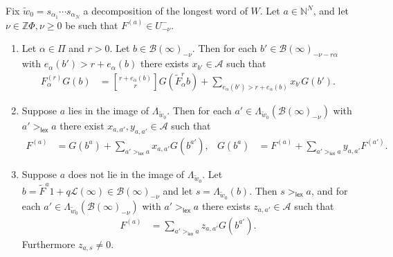 \documentclass[11pt,fleqn]{article}
\newcommand\NN{\mathbb N}
\newcommand\ZZ{\mathbb Z}
\newcommand\qbinom[2]{\genfrac{[}{]}{0pt}{0}{#1}{#2}}
\newcommand\A{\mathcal A}
\newcommand\B{\mathcal B}
\renewcommand\L{\mathcal L}
\newcommand\lex{\mathsf{lex}}
\begin{document}
\begin{Lemma*}
Fix $\tilde w_0 = s_{\alpha_1} \cdots s_{\alpha_N}$ a decomposition of the 
longest word of $W$. Let $a \in \NN^N$, and let $\nu \in \ZZ\Phi, \nu \geq 0$ 
be such that $F^{(a)} \in U^-_{-\nu}$.
\begin{enumerate}[label=(\alph*)]
\item 
\label{pre}
Let $\alpha \in \Pi$ and $r > 0$. Let $b \in \B(\infty)_{-\nu}$. Then
for each $b' \in \B(\infty)_{-\nu - r\alpha}$ with $e_\alpha(b') > r + 
e_\alpha(b)$ there exists $x_{b'} \in \A$ such that
\begin{align*}
F^{(r)}_\alpha G(b) 
  &= \qbinom{r+e_\alpha(b)}{r} G(\tilde F_{\alpha}^r b) 
  	+ \sum_{e_{\alpha}(b') > r + e_\alpha(b)} x_{b'} G(b').
\end{align*}

\item 
\label{in-image}
Suppose $a$ lies in the image of $\Lambda_{\tilde w_0}$. Then for each $a' \in 
\Lambda_{\tilde w_0} (\B(\infty)_{-\nu})$ with $a' >_{\lex} a$ there exist 
$x_{a,a'}, y_{a,a'} \in \A$ such that
\begin{align*}
F^{(a)}
  &= G(b^a) + \sum_{a' >_{\lex} a} x_{a,a'} G(b^{a'}), &
G(b^a) 
  &= F^{(a)} + \sum_{a' >_{\lex} a} y_{a,a'} F^{(a')}.
\end{align*}

\item 
\label{not-in-image}
Suppose $a$ does not lie in the image of $\Lambda_{\tilde w_0}$. Let $b = 
\tilde F^a 1 + q\L(\infty) \in \B(\infty)_{-\nu}$ and let $s = 
\Lambda_{\tilde w_0}(b)$. Then $s >_{\lex} a$, and for each $a'\in 
\Lambda_{\tilde w_0} (\B(\infty)_{-\nu})$ with $a' >_{\lex} a$ there exists 
$z_{a,a'} \in \A$ such that
\begin{align*}
	F^{(a)} &= \sum_{a' >_\lex a} z_{a,a'} G(b^{a'}).
\end{align*}
Furthermore $z_{a,s} \neq 0$.
\end{enumerate}
\end{Lemma*}
\end{document}

